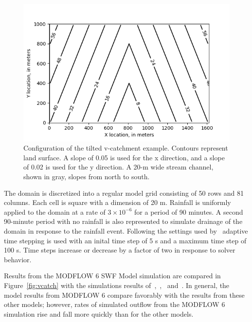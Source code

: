 \documentclass[fleqn]{article}
\begin{document}
\begin{figure}[h!tbp]
	\centering
	\includegraphics[scale=0.75]{figures/vcatch-surface.png}
	\caption[Configuration of the tilted v-catchment example.]{Configuration of the tilted v-catchment example.  Contours represent land surface.  A slope of 0.05 is used for the x direction, and a slope of 0.02 is used for the y direction.  A 20-m wide stream channel, shown in gray, slopes from north to south.}
	\label{fig:vcatch-surface}
\end{figure}

The domain is discretized into a regular model grid consisting of 50 rows and 81 columns.  Each cell is square with a dimension of 20 m.  Rainfall is uniformly applied to the domain at a rate of $3 \times 10^{-6}$ for a period of 90 minutes.  A second 90-minute period with no rainfall is also represented to simulate drainage of the domain in response to the rainfall event.  Following the settings used by~\cite{panday2004} adaptive time stepping is used with an inital time step of 5 s and a maximum time step of 100 s.  Time steps increase or decrease by a factor of two in response to solver behavior.

Results from the MODFLOW 6 SWF Model simulation are compared in Figure~\ref{fig:vcatch} with the simulations results of~\cite{digiammarco1996},~\cite{VanderKwaak1999},~\cite{panday2004} and~\cite{hughes2015}.  In general, the model results from MODFLOW 6 compare favorably with the results from these other models; however, rates of simulated outflow from the MODFLOW 6 simulation rise and fall more quickly than for the other models.
\end{document}
